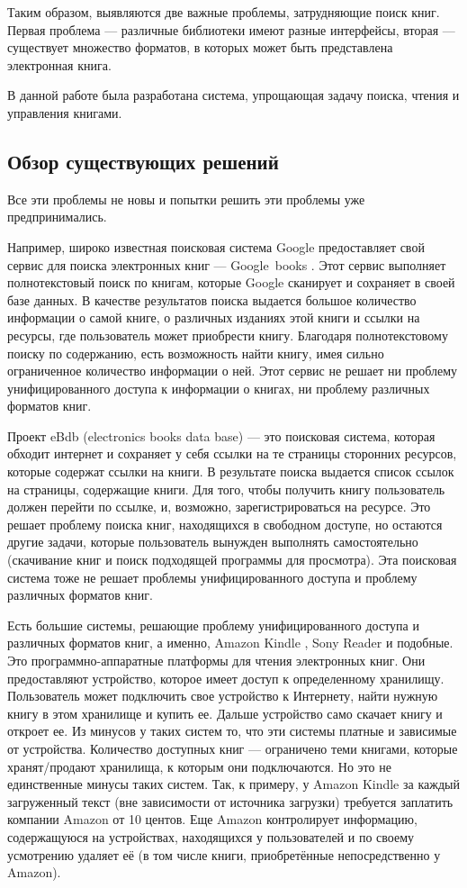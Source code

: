 Таким образом, выявляются две важные проблемы, затрудняющие поиск книг. Первая проблема --- различные библиотеки имеют разные интерфейсы, вторая --- существует множество форматов, в которых может быть представлена электронная книга. 

В данной работе была разработана система, упрощающая задачу поиска, чтения и управления книгами. 


\subsection{Обзор существующих решений}

Все эти проблемы не новы и попытки решить эти проблемы уже предпринимались.

Например, широко известная поисковая система Google предоставляет свой сервис для поиска электронных книг --- Google~books \cite{googleBook}. Этот сервис выполняет полнотекстовый поиск по книгам, которые Google сканирует и сохраняет в своей базе данных. В качестве результатов поиска выдается большое количество информации о самой книге, о различных изданиях этой книги и ссылки на ресурсы, где пользователь может приобрести книгу. Благодаря полнотекстовому поиску  по содержанию, есть возможность найти книгу, имея сильно ограниченное количество информации о ней. Этот сервис не решает ни проблему унифицированного доступа к информации о книгах, ни проблему различных форматов книг.

Проект eBdb (electronics books data base) \cite{ebdb} --- это поисковая система, которая обходит интернет и сохраняет у себя ссылки на те страницы сторонних ресурсов, которые содержат ссылки на книги. В результате поиска выдается список ссылок на страницы, содержащие книги. Для того, чтобы получить книгу пользователь должен перейти по ссылке, и, возможно, зарегистрироваться на ресурсе. Это решает проблему поиска книг, находящихся в свободном доступе, но остаются другие задачи, которые пользователь вынужден выполнять самостоятельно (скачивание книг и поиск подходящей программы для просмотра). Эта поисковая система тоже не решает проблемы унифицированного доступа и проблему различных форматов книг.

Есть большие системы, решающие проблему унифицированного доступа и различных форматов книг, а именно, Amazon Kindle \cite{kindle}, Sony Reader \cite{sonyreader} и подобные. 
Это программно-аппаратные платформы для чтения электронных книг. Они предоставляют устройство, которое имеет доступ к определенному хранилищу. Пользователь может подключить свое устройство к Интернету, найти нужную книгу в этом хранилище и купить ее. Дальше устройство само скачает книгу и откроет ее.
Из минусов у таких систем то, что эти системы платные и зависимые от устройства. Количество доступных книг --- ограничено теми книгами, которые хранят/продают хранилища, к которым они подключаются. Но это не единственные минусы таких систем. Так, к примеру, у Amazon Kindle за каждый загруженный текст (вне зависимости от источника загрузки) требуется заплатить компании Amazon от 10 центов. Еще Amazon контролирует информацию, содержащуюся на устройствах, находящихся у пользователей и по своему усмотрению удаляет её (в том числе книги, приобретённые непосредственно у Amazon).


